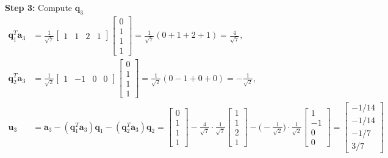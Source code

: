 \textbf{Step 3:} Compute $\mathbf{q}_3$
\begin{align*}
    \mathbf{q}_1^T\mathbf{a}_3 & = \frac{1}{\sqrt{7}}
    \begin{bmatrix} 1 & 1 & 2 & 1 \end{bmatrix}
    \begin{bmatrix} 0 \\ 1 \\ 1 \\ 1 \end{bmatrix}
    = \frac{1}{\sqrt{7}}(0+1+2+1) = \frac{4}{\sqrt{7}},                                                                                                                                                                                                                            \\
    \mathbf{q}_2^T\mathbf{a}_3 & = \frac{1}{\sqrt{2}}
    \begin{bmatrix} 1 & -1 & 0 & 0 \end{bmatrix}
    \begin{bmatrix} 0 \\ 1 \\ 1 \\ 1 \end{bmatrix}
    = \frac{1}{\sqrt{2}}(0-1+0+0) = -\frac{1}{\sqrt{2}},                                                                                                                                                                                                                           \\
    \mathbf{u}_3               & = \mathbf{a}_3 - (\mathbf{q}_1^T\mathbf{a}_3)\mathbf{q}_1 - (\mathbf{q}_2^T\mathbf{a}_3)\mathbf{q}_2
    = \begin{bmatrix} 0 \\ 1 \\ 1 \\ 1 \end{bmatrix}
    - \frac{4}{\sqrt{7}}\cdot\frac{1}{\sqrt{7}}\begin{bmatrix} 1 \\ 1 \\ 2 \\ 1 \end{bmatrix}
    -\Big(-\frac{1}{\sqrt{2}}\Big)\cdot\frac{1}{\sqrt{2}}\begin{bmatrix} 1 \\ -1 \\ 0 \\ 0 \end{bmatrix}
    = \begin{bmatrix} -1/14 \\ -1/14 \\ -1/7 \\ 3/7 \end{bmatrix}                                                                                                                                                                                                                  \\

\end{align*}
